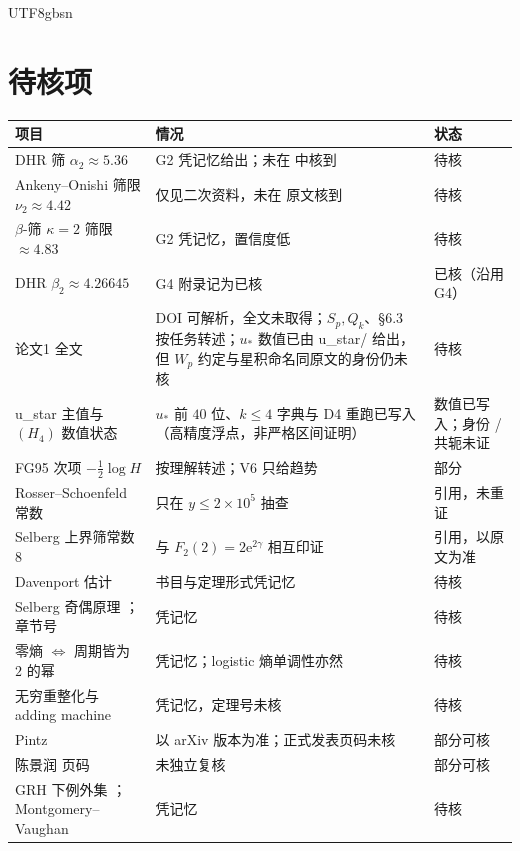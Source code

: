 \documentclass[11pt,a4paper]{article}
\newcommand{\ust}{u_{*}}               %
\newcommand{\ee}{\mathrm e}
\theoremstyle{plain}
\theoremstyle{definition}
\begin{document}
\begin{CJK}{UTF8}{gbsn}
\appendix
\section{待核项}\label{paper:app:pending}
\begin{center}
\small
\begin{tabular}{p{4.0cm}p{7.0cm}p{3.4cm}}
\hline
项目 & 情况 & 状态\\
\hline
DHR 筛 $\alpha_2\approx5.36$ & G2 凭记忆给出；未在 \cite{DHR88,DH08} 中核到 & 待核\\
Ankeny--Onishi 筛限 $\nu_2\approx4.42$ & 仅见二次资料，未在 \cite{AO65} 原文核到 & 待核\\
$\beta$-筛 $\kappa=2$ 筛限 $\approx4.83$ & G2 凭记忆，置信度低 & 待核\\
DHR $\beta_2\approx4.26645$ & G4 附录记为已核 & 已核（沿用 G4）\\
论文1 \cite{Wang26} 全文 & DOI 可解析，全文未取得；$S_p,Q_k$、\S6.3 按任务转述；$\ust$ 数值已由 u\_star/ 给出，但 $W_p$ 约定与星积命名同原文的身份仍未核 & 待核\\
u\_star 主值与 $(H_4)$ 数值状态 & $\ust$ 前 $40$ 位、$k\le4$ 字典与 D4 重跑已写入（高精度浮点，非严格区间证明） & 数值已写入；身份 / 共轭未证\\
FG95 次项 $-\frac12\log H$ & 按理解转述；V6 只给趋势 & 部分\\
Rosser--Schoenfeld 常数 \cite{RS62} & 只在 $y\le2\times10^5$ 抽查 & 引用，未重证\\
Selberg 上界筛常数 $8$ \cite{HR74} & 与 $F_2(2)=2\ee^{2\gamma}$ 相互印证 & 引用，以原文为准\\
Davenport 估计 \cite{Dav37} & 书目与定理形式凭记忆 & 待核\\
Selberg 奇偶原理 \cite{Sel49}；\cite{FI10} 章节号 & 凭记忆 & 待核\\
零熵 $\iff$ 周期皆为 $2$ 的幂 \cite{BC92} & 凭记忆；logistic 熵单调性亦然 & 待核\\
无穷重整化与 adding machine \cite{dMvS93} & 凭记忆，定理号未核 & 待核\\
Pintz \cite{Pin18} & 以 arXiv 版本为准；正式发表页码未核 & 部分可核\\
陈景润 \cite{Chen73} 页码 & 未独立复核 & 部分可核\\
GRH 下例外集 \cite{HL24}；Montgomery--Vaughan \cite{MV75} & 凭记忆 & 待核\\
\hline
\end{tabular}
\end{center}


\end{CJK}
\end{document}

